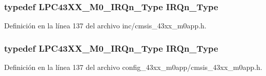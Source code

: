 \subsubsection[{\texorpdfstring{I\+R\+Qn\+\_\+\+Type}{IRQn_Type}}]{\setlength{\rightskip}{0pt plus 5cm}typedef {\bf L\+P\+C43\+X\+X\+\_\+\+M0\+\_\+\+I\+R\+Qn\+\_\+\+Type} {\bf I\+R\+Qn\+\_\+\+Type}}\hypertarget{group___c_m_s_i_s__43_x_x___m0_gaf9da996d1de1fbce33c325fc3c4292da}{}\label{group___c_m_s_i_s__43_x_x___m0_gaf9da996d1de1fbce33c325fc3c4292da}


Definición en la línea 137 del archivo inc/cmsis\+\_\+43xx\+\_\+m0app.\+h.

\subsubsection[{\texorpdfstring{I\+R\+Qn\+\_\+\+Type}{IRQn_Type}}]{\setlength{\rightskip}{0pt plus 5cm}typedef {\bf L\+P\+C43\+X\+X\+\_\+\+M0\+\_\+\+I\+R\+Qn\+\_\+\+Type} {\bf I\+R\+Qn\+\_\+\+Type}}\hypertarget{group___c_m_s_i_s__43_x_x___m0_gaf9da996d1de1fbce33c325fc3c4292da}{}\label{group___c_m_s_i_s__43_x_x___m0_gaf9da996d1de1fbce33c325fc3c4292da}


Definición en la línea 137 del archivo config\+\_\+43xx\+\_\+m0app/cmsis\+\_\+43xx\+\_\+m0app.\+h.

